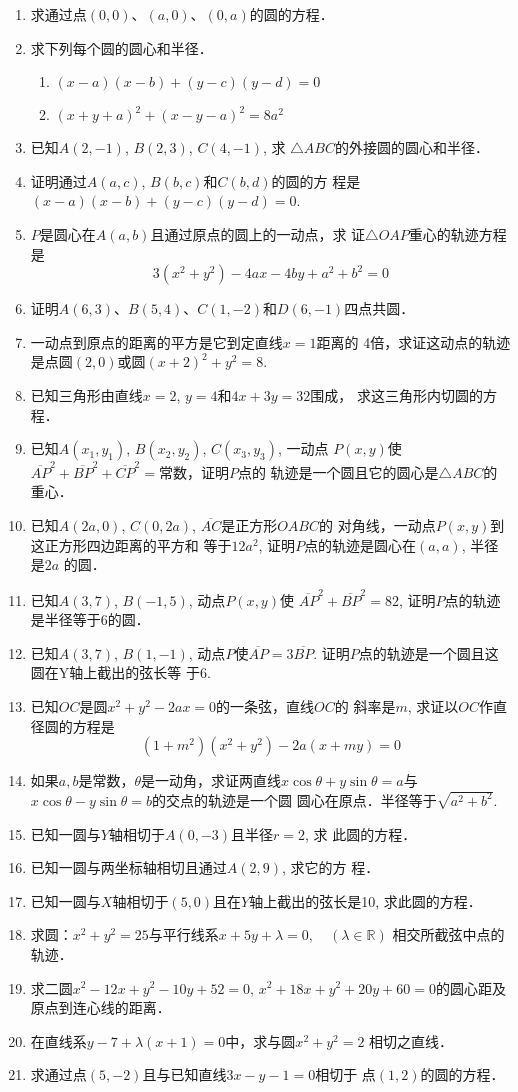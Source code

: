 \begin{enumerate}

\item 求通过点$(0,0)$、$(a,0)$、$(0,a)$的圆的方程．
\item 求下列每个圆的圆心和半径．
\begin{enumerate}
    \item $(x-a)(x-b)+(y-c)(y-d)=0$
    \item $(x+y+a)^2+(x-y-a)^2=8a^2$
\end{enumerate}

\item 已知$A(2,-1)$, $B(2,3)$, $C(4,-1)$, 求
$\triangle ABC$的外接圆的圆心和半径．
\item 证明通过$A(a,c)$, $B(b,c)$和$C(b,d)$的圆的方
程是$(x-a)(x-b)+(y-c)(y-d)=0$.
\item $P$是圆心在$A(a,b)$且通过原点的圆上的一动点，求
证$\triangle OAP$重心的轨迹方程是
\[3(x^2+y^2)-4ax-4by+a^2+b^2=0\]
\item 证明$A(6,3)$、$B(5,4)$、$C(1,-2)$和$D(6,
-1)$四点共圆．
\item 一动点到原点的距离的平方是它到定直线$x=1$距离的
4倍，求证这动点的轨迹是点圆$(2,0)$或圆$(x+2)^2
+y^2=8$.
\item 已知三角形由直线$x=2$, $y=4$和$4x+3y=32$围成，
求这三角形内切圆的方程．
\item 已知$A(x_1,y_1)$, $B(x_2,y_2)$, $C(x_3,y_3)$, 一动点
$P(x,y)$使$\overline{AP}^2+\overline{BP}^2+\overline{CP}^2=$常数，证明$P$点的
轨迹是一个圆且它的圆心是$\triangle ABC$的重心．
\item 已知$A(2a,0)$, $C(0,2a)$, $\overline{AC}$是正方形$OABC$的
对角线，一动点$P(x,y)$到这正方形四边距离的平方和
等于$12a^2$, 证明$P$点的轨迹是圆心在$(a,a)$, 半径是$2a$
的圆．
\item 已知$A(3,7)$, $B(-1,5)$, 动点$P(x,y)$使
$\overline{AP}^2+\overline{BP}^2=82$, 证明$P$点的轨迹是半径等于6的圆．
\item 已知$A(3,7)$, $B(1,-1)$, 动点$P$使$\overline{AP}=3\overline{BP}$. 
证明$P$点的轨迹是一个圆且这圆在Y轴上截出的弦长等
于6.
\item 已知$OC$是圆$x^2+y^2-2ax=0$的一条弦，直线$OC$的
斜率是$m$, 求证以$OC$作直径圆的方程是
\[(1+m^2)(x^2+y^2)-2a(x+my)=0\]
\item 如果$a,b$是常数，$\theta$是一动角，求证两直线$x\cos\theta+
y\sin\theta=a$与$x\cos\theta-y\sin\theta=b$的交点的轨迹是一个圆
圆心在原点．半径等于$\sqrt{a^2+b^2}$.
\item 已知一圆与$Y$轴相切于$A(0,-3)$且半径$r=2$, 求
此圆的方程．
\item 已知一圆与两坐标轴相切且通过$A(2,9)$, 求它的方
程．
\item 已知一圆与$X$轴相切于$(5,0)$且在$Y$轴上截出的弦长是10, 求此圆的方程．
\item 求圆：$x^2+y^2=25$与平行线系$x+5y+\lambda=0,\quad (\lambda\in\mathbb{R})$
相交所截弦中点的轨迹．
\item 求二圆$x^2-12x+y^2-10y+52=0$, $x^2+18x+y^2+
20y+60=0$的圆心距及原点到连心线的距离．
\item 在直线系$y-7+\lambda(x+1)=0$中，求与圆$x^2+y^2=2$
相切之直线．
\item 求通过点$(5,-2)$且与已知直线$3x-y-1=0$相切于
点$(1,2)$的圆的方程．
\end{enumerate}

